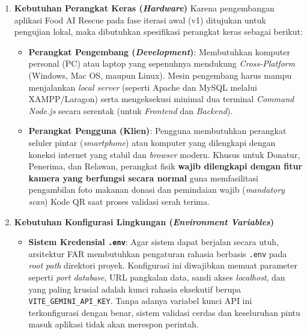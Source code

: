 \begin{enumerate}
    \item \textbf{Kebutuhan Perangkat Keras (\textit{Hardware})}
    Karena pengembangan aplikasi Food AI Rescue pada fase iterasi awal (v1) ditujukan untuk pengujian lokal, maka dibutuhkan spesifikasi perangkat keras sebagai berikut:
    \begin{itemize}
        \item \textbf{Perangkat Pengembang (\textit{Development})}: Membutuhkan komputer personal (PC) atau laptop yang sepenuhnya mendukung \textit{Cross-Platform} (Windows, Mac OS, maupun Linux). Mesin pengembang harus mampu menjalankan \textit{local server} (seperti Apache dan MySQL melalui XAMPP/Laragon) serta mengeksekusi minimal dua terminal \textit{Command Node.js} secara serentak (untuk \textit{Frontend} dan \textit{Backend}).
        \item \textbf{Perangkat Pengguna (Klien)}: Pengguna membutuhkan perangkat seluler pintar (\textit{smartphone}) atau komputer yang dilengkapi dengan koneksi internet yang stabil dan \textit{browser} modern. Khusus untuk Donatur, Penerima, dan Relawan, perangkat fisik \textbf{wajib dilengkapi dengan fitur kamera yang berfungsi secara normal} guna memfasilitasi pengambilan foto makanan donasi dan pemindaian wajib (\textit{mandatory scan}) Kode QR saat proses validasi serah terima.
    \end{itemize}

    \item \textbf{Kebutuhan Konfigurasi Lingkungan (\textit{Environment Variables})}
    \begin{itemize}
        \item \textbf{Sistem Kredensial \texttt{.env}}: Agar sistem dapat berjalan secara utuh, arsitektur FAR membutuhkan pengaturan rahasia berbasis \texttt{.env} pada \textit{root path} direktori proyek. Konfigurasi ini diwajibkan memuat parameter seperti \textit{port database}, URL pangkalan data, sandi akses \textit{localhost}, dan yang paling krusial adalah kunci rahasia eksekutif berupa \texttt{VITE\_GEMINI\_API\_KEY}. Tanpa adanya variabel kunci API ini terkonfigurasi dengan benar, sistem validasi cerdas dan keseluruhan pintu masuk aplikasi tidak akan merespon perintah.
    \end{itemize}
\end{enumerate}


